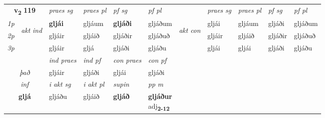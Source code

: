 \noindent
\begin{tabular}{lllllllllll} \toprule
\multicolumn{2}{c}{\textbf{v{\textsubscript{2}}} \Large{\textbf{119}}}  &  \textit{praes sg}  & \textit{praes pl}  &\textit{ pf sg} & \textit{pf pl} &  &  \textit{praes sg}  & \textit{praes pl}  & \textit{pf sg} & \textit{pf pl } \\*
	\cmidrule{3-6} \cmidrule{8-11}
 {\textit{1p}} & \multirow{3}{*}{\begin{turn}{90}\textit{akt ind}\end{turn}} & \textbf{gljái} & gljáum & \textbf{gljáði} & gljáðum & \multirow{3}{*}{\begin{turn}{90}\textit{akt con}\end{turn}} &gljái & gljáum & gljáði & gljáðum\\*
 {\textit{2p}} &  &  gljáir  & gljáið & gljáðir & gljáðuð & & gljáir & gljáið & gljáðir & gljáðuð \\*
{\textit{3p}} &  & gljáir & gljá & gljáði & gljáðu & & gljái & gljái& gljáði & gljáðu \\*
\cmidrule{3-6} \cmidrule{8-11}

   & &  \textit{ind praes} & \textit{ind pf} & \textit{con praes} & \textit{con pf} \\*
\multicolumn{2}{c}{ \textit{það} } & gljáir & gljáði & gljái & gljáði \\*

\cmidrule{3-6}
   \multicolumn{2}{c}{\textit{inf}}  & \textit{i akt sg} & \textit{i akt pl}    & \textit{supin}  & \textit{pp m} \\*
  \multicolumn{2}{c}{\textbf{gljá}} & gljáðu  & gljáið    &  \textbf{gljáð}  & \specialcell{\textbf{gljáður} \\ adj\textbf{\textsubscript{2-12}}} \\*
\end{tabular}

